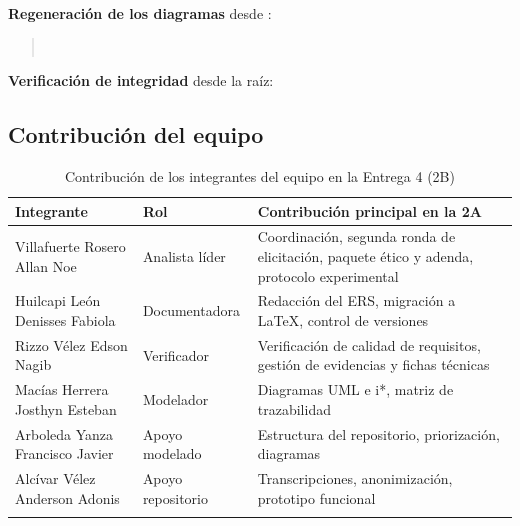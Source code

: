 \noindent
\textbf{Regeneración de los diagramas} desde :

\begin{quote}
\\
\end{quote}

\noindent
\textbf{Verificación de integridad} desde la raíz: 

\subsection{Contribución del equipo}

\begin{longtable}{|L{4.4cm}|L{4.0cm}|L{6.8cm}|}
\hline
{}\textbf{Integrante} & \textbf{Rol} & \textbf{Contribución principal en la 2A} \\
\hline
\endhead
Villafuerte Rosero Allan Noe & Analista líder & Coordinación, segunda ronda de elicitación, paquete ético y adenda, protocolo experimental \\ \hline
Huilcapi León Denisses Fabiola & Documentadora & Redacción del ERS, migración a \LaTeX, control de versiones \\ \hline
Rizzo Vélez Edson Nagib & Verificador & Verificación de calidad de requisitos, gestión de evidencias y fichas técnicas \\ \hline
Macías Herrera Josthyn Esteban & Modelador & Diagramas UML e i*, matriz de trazabilidad \\ \hline
Arboleda Yanza Francisco Javier & Apoyo modelado & Estructura del repositorio, priorización, diagramas \\ \hline
Alcívar Vélez Anderson Adonis & Apoyo repositorio & Transcripciones, anonimización, prototipo funcional \\ \hline
\caption{Contribución de los integrantes del equipo en la Entrega 4 (2B)}
\end{longtable}




